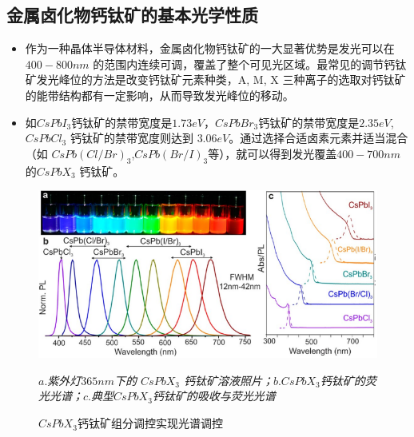 \documentclass{beamer}[fontset=windows]
\begin{document}
\subsection{金属卤化物钙钛矿的基本光学性质}
\begin{frame}
	\begin{itemize}
		\item 作为一种晶体半导体材料，金属卤化物钙钛矿的一大显著优势是发光可以在$400-800 nm$ 的范围内连续可调，覆盖了整个可见光区域\cite{stranks2015metal}。最常见的调节钙钛矿发光峰位的方法是改变钙钛矿元素种类，A, M, X 三种离子的选取对钙钛矿的能带结构都有一定影响，从而导致发光峰位的移动\cite{sutherland2016perovskite}。
		\item 如$ CsPbI_{3}$钙钛矿的禁带宽度是$1.73eV$\cite{swarnkar2016quantum}，$CsPbBr_{3}$钙钛矿的禁带宽度是$2.35 eV$\cite{becker2018bright}, $CsPbCl_{3}$ 钙钛矿的禁带宽度则达到 $3.06 eV$\cite{becker2018bright}。通过选择合适卤素元素并适当混合（如 $CsPb(Cl/Br)_{3}$,$CsPb(Br/I)_{3}$等），就可以得到发光覆盖$400-700nm$的$CsPbX_{3}$ 钙钛矿。
	\end{itemize}
\end{frame}	
\begin{frame}
	\begin{figure}[H]
		\centering
		\hspace{2em}\includegraphics[width=.75\linewidth]{pic/2.png}
		\caption{$CsPbX_{3}$钙钛矿组分调控实现光谱调控\cite{yakunin2015low}
		}
	\itshape
	$a.$紫外灯$365 nm$下的 $CsPbX_{3}$ 钙钛矿溶液照片；$b.CsPbX_{3}$钙钛矿的荧光光谱；$c.$典型$ CsPbX_{3} $钙钛矿的吸收与荧光光谱
	\end{figure}
\end{frame}
\end{document}
